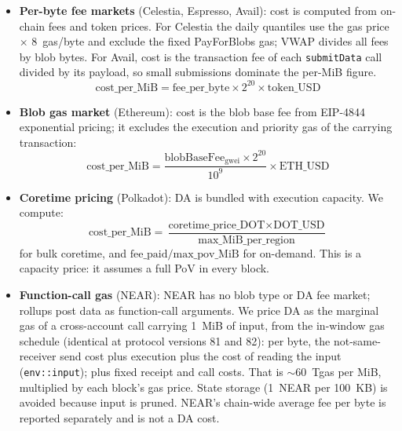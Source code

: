 \begin{itemize}
    \item \textbf{Per-byte fee markets} (Celestia, Espresso, Avail): cost is computed from on-chain fees and token prices. For Celestia the daily quantiles use the gas price $\times$ 8~gas/byte and exclude the fixed PayForBlobs gas; VWAP divides all fees by blob bytes. For Avail, cost is the transaction fee of each \texttt{submitData} call divided by its payload, so small submissions dominate the per-MiB figure.
    \begin{equation}
        \text{cost\_per\_MiB} = \text{fee\_per\_byte} \times 2^{20} \times \text{token\_USD}
    \end{equation}

    \item \textbf{Blob gas market} (Ethereum): cost is the blob base fee from EIP-4844 exponential pricing; it excludes the execution and priority gas of the carrying transaction:
    \begin{equation}
        \text{cost\_per\_MiB} = \frac{\text{blobBaseFee}_{\text{gwei}} \times 2^{20}}{10^{9}} \times \text{ETH\_USD}
    \end{equation}

    \item \textbf{Coretime pricing} (Polkadot): DA is bundled with execution capacity. We compute:
    \begin{equation}
        \text{cost\_per\_MiB} = \frac{\text{coretime\_price\_DOT} \times \text{DOT\_USD}}{\text{max\_MiB\_per\_region}}
    \end{equation}
    for bulk coretime, and $\text{fee\_paid} / \text{max\_pov\_MiB}$ for on-demand.
    This is a capacity price: it assumes a full PoV in every block.

    \item \textbf{Function-call gas} (NEAR): NEAR has no blob type or DA fee market; rollups post data as function-call arguments. We price DA as the marginal gas of a cross-account call carrying 1~MiB of input, from the in-window gas schedule (identical at protocol versions 81 and 82): per byte, the not-same-receiver send cost plus execution plus the cost of reading the input (\texttt{env::input}); plus fixed receipt and call costs. That is $\sim$60~Tgas per MiB, multiplied by each block's gas price. State storage (1~NEAR per 100~KB) is avoided because input is pruned. NEAR's chain-wide average fee per byte is reported separately and is not a DA cost.
\end{itemize}

